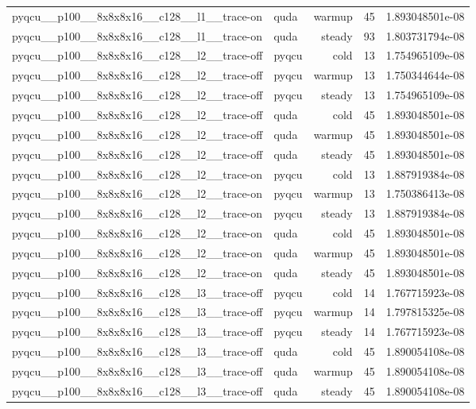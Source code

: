 \begin{table}[htbp]
\begin{tabular}{@{}llrrr@{}}
pyqcu\_\_p100\_\_8x8x8x16\_\_c128\_\_l1\_\_trace-on & quda & warmup & 45 & 1.893048501e-08 \\
pyqcu\_\_p100\_\_8x8x8x16\_\_c128\_\_l1\_\_trace-on & quda & steady & 93 & 1.803731794e-08 \\
pyqcu\_\_p100\_\_8x8x8x16\_\_c128\_\_l2\_\_trace-off & pyqcu & cold & 13 & 1.754965109e-08 \\
pyqcu\_\_p100\_\_8x8x8x16\_\_c128\_\_l2\_\_trace-off & pyqcu & warmup & 13 & 1.750344644e-08 \\
pyqcu\_\_p100\_\_8x8x8x16\_\_c128\_\_l2\_\_trace-off & pyqcu & steady & 13 & 1.754965109e-08 \\
pyqcu\_\_p100\_\_8x8x8x16\_\_c128\_\_l2\_\_trace-off & quda & cold & 45 & 1.893048501e-08 \\
pyqcu\_\_p100\_\_8x8x8x16\_\_c128\_\_l2\_\_trace-off & quda & warmup & 45 & 1.893048501e-08 \\
pyqcu\_\_p100\_\_8x8x8x16\_\_c128\_\_l2\_\_trace-off & quda & steady & 45 & 1.893048501e-08 \\
pyqcu\_\_p100\_\_8x8x8x16\_\_c128\_\_l2\_\_trace-on & pyqcu & cold & 13 & 1.887919384e-08 \\
pyqcu\_\_p100\_\_8x8x8x16\_\_c128\_\_l2\_\_trace-on & pyqcu & warmup & 13 & 1.750386413e-08 \\
pyqcu\_\_p100\_\_8x8x8x16\_\_c128\_\_l2\_\_trace-on & pyqcu & steady & 13 & 1.887919384e-08 \\
pyqcu\_\_p100\_\_8x8x8x16\_\_c128\_\_l2\_\_trace-on & quda & cold & 45 & 1.893048501e-08 \\
pyqcu\_\_p100\_\_8x8x8x16\_\_c128\_\_l2\_\_trace-on & quda & warmup & 45 & 1.893048501e-08 \\
pyqcu\_\_p100\_\_8x8x8x16\_\_c128\_\_l2\_\_trace-on & quda & steady & 45 & 1.893048501e-08 \\
pyqcu\_\_p100\_\_8x8x8x16\_\_c128\_\_l3\_\_trace-off & pyqcu & cold & 14 & 1.767715923e-08 \\
pyqcu\_\_p100\_\_8x8x8x16\_\_c128\_\_l3\_\_trace-off & pyqcu & warmup & 14 & 1.797815325e-08 \\
pyqcu\_\_p100\_\_8x8x8x16\_\_c128\_\_l3\_\_trace-off & pyqcu & steady & 14 & 1.767715923e-08 \\
pyqcu\_\_p100\_\_8x8x8x16\_\_c128\_\_l3\_\_trace-off & quda & cold & 45 & 1.890054108e-08 \\
pyqcu\_\_p100\_\_8x8x8x16\_\_c128\_\_l3\_\_trace-off & quda & warmup & 45 & 1.890054108e-08 \\
pyqcu\_\_p100\_\_8x8x8x16\_\_c128\_\_l3\_\_trace-off & quda & steady & 45 & 1.890054108e-08 \\

\end{tabular}
\end{table}
